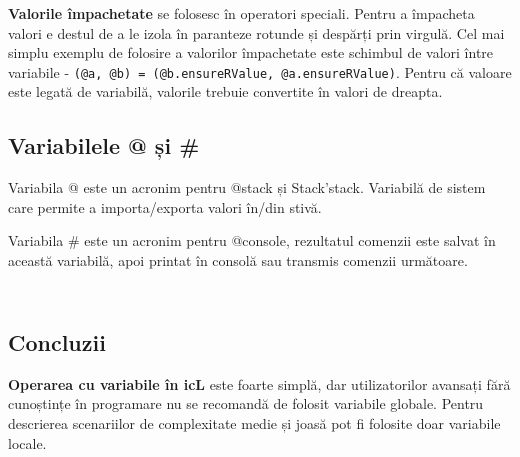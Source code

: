 {\bf Valorile împachetate} se folosesc în operatori speciali. Pentru a împacheta valori e destul de a le izola în paranteze rotunde și despărți prin virgulă. Cel mai simplu exemplu de folosire a valorilor împachetate este schimbul de valori între variabile - \texttt{(@a, @b) = (@b.ensureRValue, @a.ensureRValue)}. Pentru că valoare este legată de variabilă, valorile trebuie convertite în valori de dreapta.

\subsection{Variabilele @ și \#}

{Variabila @} este un acronim pentru @stack și Stack'stack. Variabilă de sistem care permite a importa/exporta valori în/din stivă. 

{Variabila \#} este un acronim pentru @console, rezultatul comenzii este salvat în această variabilă, apoi printat în consolă sau transmis comenzii următoare.


\begin{sourcecode}
\label{globalvars}
\inputminted[linenos]{icl}{../sources/globalvars.icL}
\end{sourcecode}

\begin{sourcecode}
\label{rlvalues}
\inputminted[linenos]{icl}{../sources/rlvalues.icL}
\end{sourcecode}

\subsection{Concluzii}

{\bf Operarea cu variabile în icL} este foarte simplă, dar utilizatorilor avansați fără cunoștințe în programare nu se recomandă de folosit variabile globale. Pentru descrierea scenariilor de complexitate medie și joasă pot fi folosite doar variabile locale.
